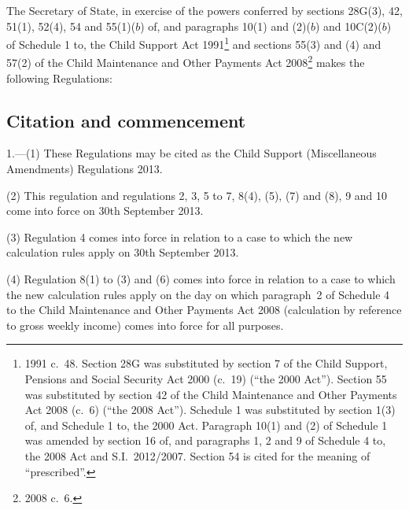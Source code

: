 \documentclass[12pt,a4paper]{article}
\title{\regstitle}
\author{S.I.\ 2013 No.\ 1517}
\date{Made
18th June 2013\\
Laid before Parliament
27th June 2013\\
Coming into force
in accordance with regulation 1(2) to (4)
}
\begin{document}
\maketitle

\enlargethispage{\baselineskip}

\noindent
The Secretary of State, in exercise of the powers conferred by sections 28G(3), 42, 51(1), 52(4), 54 and 55(1)($b$)  of, and paragraphs 10(1) and (2)($b$)  and 10C(2)($b$)  of Schedule 1 to, the Child Support Act 1991\footnote{1991 c.~48. Section 28G was substituted by section 7 of the Child Support, Pensions and Social Security Act 2000 (c.~19) (“the 2000 Act”). Section 55 was substituted by section 42 of the Child Maintenance and Other Payments Act 2008 (c.~6) (“the 2008 Act”). Schedule 1 was substituted by section 1(3) of, and Schedule 1 to, the 2000 Act. Paragraph 10(1) and (2) of Schedule 1 was amended by section 16 of, and paragraphs 1, 2 and 9 of Schedule 4 to, the 2008 Act and S.I.~2012/2007. Section 54 is cited for the meaning of “prescribed”.} and sections 55(3) and (4) and 57(2) of the Child Maintenance and Other Payments Act 2008\footnote{2008 c.~6.} makes the following Regulations: 

{\sloppy

\tableofcontents

}

\bigskip

\setcounter{secnumdepth}{-2}

\subsection[1. Citation and commencement]{Citation and commencement}

1.---(1)  These Regulations may be cited as the Child Support (Miscellaneous Amendments) Regulations 2013.

(2) This regulation and regulations 2, 3, 5 to 7, 8(4), (5), (7) and (8), 9 and 10 come into force on 30th September 2013.

(3) Regulation 4 comes into force in relation to a case to which the new calculation rules apply on 30th September 2013.

(4) Regulation 8(1) to (3) and (6) comes into force in relation to a case to which the new calculation rules apply on the day on which paragraph~2 of Schedule 4 to the Child Maintenance and Other Payments Act 2008 (calculation by reference to gross weekly income) comes into force for all purposes.
\end{document}
